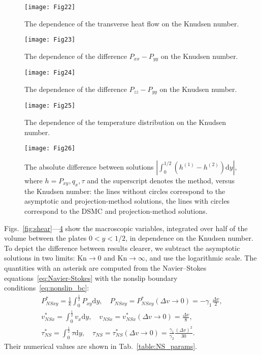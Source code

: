 \documentclass[]{elsarticle} %
\newcommand{\Kn}{\mathrm{Kn}}
\newcommand{\NS}{N\!S}
\newcommand{\dd}{\mathrm{d}}
\begin{document}
\begin{figure}
    \centering
    \texttt{[image: Fig22]}
    \caption{The dependence of the transverse heat flow on the Knudsen number.}
    \label{fig:qflowy}
\end{figure}

\begin{figure}
    \centering
    \texttt{[image: Fig23]}
    \caption{The dependence of the difference \(P_{xx}-P_{yy}\) on the Knudsen number.}
    \label{fig:pxx}
\end{figure}

\begin{figure}
    \centering
    \texttt{[image: Fig24]}
    \caption{The dependence of the difference \(P_{zz}-P_{yy}\) on the Knudsen number.}
    \label{fig:pzz}
\end{figure}

\begin{figure}
    \centering
    \texttt{[image: Fig25]}
    \caption{The dependence of the temperature distribution on the Knudsen number.}
    \label{fig:temp}
\end{figure}

\begin{figure}
    \centering
    \texttt{[image: Fig26]}
    \caption{The absolute difference between solutions \(|\int_0^{1/2} (h^{(1)}-h^{(2)})\dd{y}|\),
        where \(h = P_{xy}, q_x, \tau\) and the superscript denotes the method, versus the Knudsen number:
        the lines without circles correspond to the asymptotic and projection-method solutions,
        the lines with circles correspond to the DSMC and projection-method solutions.}
    \label{fig:diff}
\end{figure}

Figs.~\ref{fig:shear}---\ref{fig:temp} show the macroscopic variables,
integrated over half of the volume between the plates \(0<y<1/2\), in dependence on the Knudsen number.
To depict the difference between results clearer,
we subtract the asymptotic solutions in two limits: \(\Kn\to0\) and \(\Kn\to\infty\),
and use the logarithmic scale.
The quantities with an asterisk are computed from the Navier--Stokes equations~\eqref{eq:Navier-Stokes}
with the nonslip boundary conditions~\eqref{eq:nonslip_bc}:
\begin{gather*}
    P_{\NS xy}^* = \frac1k \int_0^\frac12 P_{xy} \dd{y}, \quad P_{\NS xy} = P_{\NS xy}^*(\Delta{v}\to0) = -\gamma_1\frac{\Delta{v}}2, \\
    v_{\NS x}^* = \int_0^\frac12 v_x \dd{y}, \quad v_{\NS x} = v_{\NS x}^*(\Delta{v}\to0) = \frac{\Delta{v}}8, \\
    \tau_{\NS}^* = \int_0^\frac12 \tau \dd{y}, \quad
        \tau_{\NS} = \tau_{\NS}^*(\Delta{v}\to0) = \frac{\gamma_1}{\gamma_2}\frac{(\Delta{v})^2}{30}.
\end{gather*}
Their numerical values are shown in Tab.~\ref{table:NS_params}.
\end{document}
